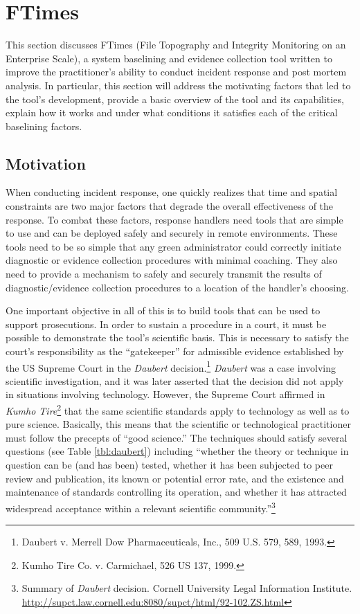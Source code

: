 \documentclass[10pt]{article}
\begin{document}
\section{FTimes}

This section discusses FTimes (File Topography and Integrity
Monitoring on an Enterprise Scale), a system baselining and evidence
collection tool written to improve the practitioner's ability to
conduct incident response and post mortem analysis.  In particular,
this section will address the motivating factors that led to the
tool's development, provide a basic overview of the tool and its
capabilities, explain how it works and under what conditions it
satisfies each of the critical baselining factors.

\subsection{Motivation}

When conducting incident response, one quickly realizes that
time and spatial constraints are two major factors that degrade
the overall effectiveness of the response.  To combat these factors,
response handlers need tools that are simple to use and can be
deployed safely and securely in remote environments.  These tools
need to be so simple that any green administrator could correctly initiate
diagnostic or evidence collection procedures with minimal coaching.
They also need to provide a mechanism to safely and securely transmit
the results of diagnostic/evidence collection procedures to a
location of the handler's choosing.

One important objective in all of this is to build tools that can
be used to support prosecutions.  In order to sustain a procedure
in a court, it must be possible to demonstrate the tool's scientific
basis.  This is necessary to satisfy the court's responsibility as
the ``gatekeeper'' for admissible evidence established by the US
Supreme Court in the {\it Daubert} decision.\footnote{Daubert v.
Merrell Dow Pharmaceuticals, Inc., 509 U.S. 579, 589, 1993.} {\it
Daubert} was a case involving scientific investigation, and it was
later asserted that the decision did not apply in situations
involving technology.  However, the Supreme Court affirmed in {\it
Kumho Tire}\footnote{Kumho Tire Co. v. Carmichael, 526 US 137,
1999.} that the same scientific standards apply to technology as
well as to pure science.  Basically, this means that the scientific
or technological practitioner must follow the precepts of ``good
science.'' The techniques should satisfy several questions (see
Table \ref{tbl:daubert}) including ``whether the theory or technique
in question can be (and has been) tested, whether it has been
subjected to peer review and publication, its known or potential
error rate, and the existence and maintenance of standards controlling
its operation, and whether it has attracted widespread acceptance
within a relevant scientific community.''\footnote{Summary of {\it
Daubert} decision.  Cornell University Legal Information
Institute.\newline
\href{http://supct.law.cornell.edu:8080/supct/html/92-102.ZS.html}
{http://supct.law.cornell.edu:8080/supct/html/92-102.ZS.html}}
\end{document}
